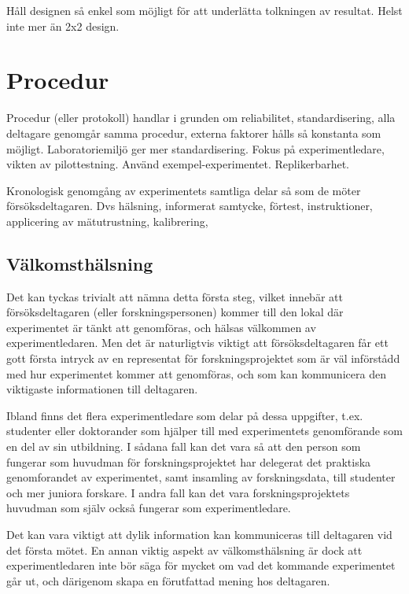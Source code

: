 \documentclass[
]{book}
\begin{document}
Håll designen så enkel som möjligt för att underlätta tolkningen av resultat. Helst inte mer än 2x2 design.

\hypertarget{sec07.6}{%
\section{Procedur}\label{sec07.6}}

Procedur (eller protokoll) handlar i grunden om reliabilitet, standardisering, alla deltagare genomgår samma procedur, externa faktorer hålls så konstanta som möjligt. Laboratoriemiljö ger mer standardisering. Fokus på experimentledare, vikten av pilottestning. Använd exempel-experimentet. Replikerbarhet.

Kronologisk genomgång av experimentets samtliga delar så som de möter försöksdeltagaren. Dvs hälsning, informerat samtycke, förtest, instruktioner, applicering av mätutrustning, kalibrering,

\hypertarget{sub07.6.1}{%
\subsection{Välkomsthälsning}\label{sub07.6.1}}

Det kan tyckas trivialt att nämna detta första steg, vilket innebär att försöksdeltagaren (eller forskningspersonen) kommer till den lokal där experimentet är tänkt att genomföras, och hälsas välkommen av experimentledaren. Men det är naturligtvis viktigt att försöksdeltagaren får ett gott första intryck av en representat för forskningsprojektet som är väl införstådd med hur experimentet kommer att genomföras, och som kan kommunicera den viktigaste informationen till deltagaren.

Ibland finns det flera experimentledare som delar på dessa uppgifter, t.ex. studenter eller doktorander som hjälper till med experimentets genomförande som en del av sin utbildning. I sådana fall kan det vara så att den person som fungerar som huvudman för forskningsprojektet har delegerat det praktiska genomforandet av experimentet, samt insamling av forskningsdata, till studenter och mer juniora forskare. I andra fall kan det vara forskningsprojektets huvudman som själv också fungerar som experimentledare.

Det kan vara viktigt att dylik information kan kommuniceras till deltagaren vid det första mötet. En annan viktig aspekt av välkomsthälsning är dock att experimentledaren inte bör säga för mycket om vad det kommande experimentet går ut, och därigenom skapa en förutfattad mening hos deltagaren.
\end{document}
